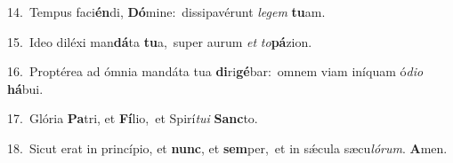 {\numbfont\textcolor{\numbcolor}{14.}}~Tempus faci\-\textbf{én}\-di, \textbf{Dó}\-mine:~\star dissipavérunt \textit{le}\-\textit{gem} \textbf{tu}\-am.\par
{\numbfont\textcolor{\numbcolor}{15.}}~Ideo diléxi man\-\textbf{dá}\-ta \textbf{tu}\-a,~\star super aurum \textit{et} \textit{to}\-\textbf{pá}zion.\par
{\numbfont\textcolor{\numbcolor}{16.}}~Proptérea ad ómnia mandáta tua \textbf{di}\-ri\-\textbf{gé}\-bar:~\star omnem viam iníquam ó\-\textit{di}\-\textit{o} \textbf{há}\-bui.\par
{\numbfont\textcolor{\numbcolor}{17.}}~Glória \textbf{Pa}\-tri, et \textbf{Fí}\-lio,~\star et Spirí\-\textit{tu}\-\textit{i} \textbf{Sanc}\-to.\par
{\numbfont\textcolor{\numbcolor}{18.}}~Sicut erat in princípio, et \textbf{nunc}\-, et \textbf{sem}\-per,~\star et in sǽcula sæcu\-\textit{ló}\-\textit{rum}. \textbf{A}\-men.\par
